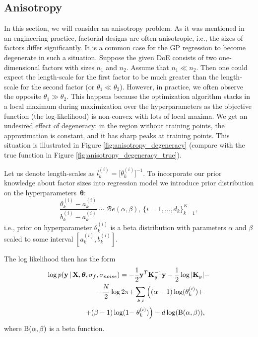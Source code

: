 \subsection{Anisotropy}
In this section, we will consider an anisotropy problem.
As it was mentioned in an engineering practice, factorial designs are
often anisotropic, i.e., the sizes of factors differ significantly.
It is a common case for the GP regression to become degenerate in such a situation.
Suppose the given DoE consists of two one-dimensional factors
with sizes $n_1$ and $n_2$.
Assume that $n_1 \ll n_2$.
Then one could expect the length-scale for the first factor to be much greater than
the length-scale for the second factor (or $\theta_1 \ll \theta_2$).
However, in practice, we often observe the opposite $\theta_1 \gg \theta_2$.
This happens because the optimization algorithm stacks in a local maximum during maximization over
the hyperparameters as the objective function (the log-likelihood) is non-convex with lots of local maxima.
We get an undesired effect of degeneracy:
in the region without training points, the approximation is constant, and it has sharp peaks at training points.
This situation is illustrated in Figure \ref{fig:anisotropy_degeneracy}
(compare with the true function in Figure \ref{fig:anisotropy_degeneracy_true}).

Let us denote length-scales as $l_k^{(i)} = \big [\theta_k^{(i)} \big ]^{-1}$.
To incorporate our prior knowledge about factor sizes into regression model
we introduce prior distribution on the hyperparameters~$\boldsymbol{\theta}$:
\begin{equation}
  \label{eq:prior}
  \frac{\theta_k^{(i)} - a_k^{(i)}}{b_k^{(i)} - a_k^{(i)}} \sim \mathcal{B}e(\alpha, \beta), \, \{ i = 1, \ldots, d_k\}_{k = 1}^K,
\end{equation}
i.e., prior on hyperparameter $\theta_k^{(i)}$ is a beta distribution with parameters $\alpha$
and $\beta$ scaled to some interval $\left [a_k^{(i)}, b_k^{(i)} \right ]$.

The log likelihood then has the form
\begin{equation}
  \label{eq:loglikelihood_prior}
  \begin{split}
    \log p(\mathbf{y} \, | \, \mathbf{X}, \boldsymbol{\theta}, \sigma_f, \sigma_{noise}) = -& \frac12 \mathbf{y}^T \mathbf{K}_y^{-1}\mathbf{y} - \frac12 \log |\mathbf{K}_y| - \\
    - \frac{N}{2} \log 2 \pi + & \sum_{k, i} \left ( (\alpha - 1) \log(\theta_k^{(i)}) + \right . \\
    + (\beta - 1) \log (1 - &  \left . \theta_k^{(i)})  \right ) - d \log({\rm B}(\alpha, \beta)),
  \end{split}
\end{equation}
where ${\rm B}(\alpha, \beta)$ is a beta function.

